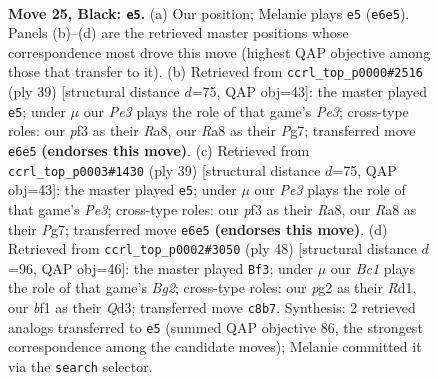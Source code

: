 \documentclass[11pt]{article}
\begin{document}
\clearpage

\begin{figure}[p]\centering
\begin{subfigure}{0.46\textwidth}\centering
\resizebox{\linewidth}{!}{%
\newchessgame
\chessboard[
  setfen={r1b1rk2/3q3p/ppn1pPp1/2p5/P4Q2/2P2P2/6PP/1KN1RBNR b - - 0 25},
  showmover=false,
  pgfstyle=straightmove, color=movearrow, markmove={e6-e5}
]}
\caption{}
\end{subfigure}\hfill
\begin{subfigure}{0.46\textwidth}\centering
\resizebox{\linewidth}{!}{%
\newchessgame
\chessboard[
  setfen={r1br2k1/1p4p1/2nqp2p/p2p4/P7/2P1RN2/1P3PPP/RB1Q2K1 b - - 2 20},
  showmover=false,
  pgfstyle=straightmove, color=movearrow, markmove={e6-e5}
]}
\caption{}
\end{subfigure}
\\[4pt]
\begin{subfigure}{0.46\textwidth}\centering
\resizebox{\linewidth}{!}{%
\newchessgame
\chessboard[
  setfen={r1br2k1/1p4p1/2nqp2p/p2p4/P7/2P1RN2/1P3PPP/RB1Q2K1 b - - 2 20},
  showmover=false,
  pgfstyle=straightmove, color=movearrow, markmove={e6-e5}
]}
\caption{}
\end{subfigure}\hfill
\begin{subfigure}{0.46\textwidth}\centering
\resizebox{\linewidth}{!}{%
\newchessgame
\chessboard[
  setfen={1n2r1k1/4qpp1/2rp4/p6p/Np2PPnP/1P1Q2P1/P5B1/3RR1K1 w - - 2 25},
  showmover=false,
  pgfstyle=straightmove, color=movearrow, markmove={g2-f3}
]}
\caption{}
\end{subfigure}
\caption{\textbf{Move 25, Black: \texttt{e5}.} (a) Our position; Melanie plays \texttt{e5} (\texttt{e6e5}). Panels (b)--(d) are the retrieved master positions whose correspondence most drove this move (highest QAP objective among those that transfer to it). (b) Retrieved from \texttt{ccrl\_top\_p0000\#2516} (ply 39) [structural distance $d$=75, QAP obj=43]: the master played \texttt{e5}; under $\mu$ our \emph{Pe3} plays the role of that game's \emph{Pe3}; cross-type roles: our \emph{p}f3 as their \emph{R}a8, our \emph{R}a8 as their \emph{P}g7; transferred move \texttt{e6e5} \textbf{(endorses this move)}. (c) Retrieved from \texttt{ccrl\_top\_p0003\#1430} (ply 39) [structural distance $d$=75, QAP obj=43]: the master played \texttt{e5}; under $\mu$ our \emph{Pe3} plays the role of that game's \emph{Pe3}; cross-type roles: our \emph{p}f3 as their \emph{R}a8, our \emph{R}a8 as their \emph{P}g7; transferred move \texttt{e6e5} \textbf{(endorses this move)}. (d) Retrieved from \texttt{ccrl\_top\_p0002\#3050} (ply 48) [structural distance $d$=96, QAP obj=46]: the master played \texttt{Bf3}; under $\mu$ our \emph{Bc1} plays the role of that game's \emph{Bg2}; cross-type roles: our \emph{p}g2 as their \emph{R}d1, our \emph{b}f1 as their \emph{Q}d3; transferred move \texttt{c8b7}. Synthesis: 2 retrieved analogs transferred to \texttt{e5} (summed QAP objective 86, the strongest correspondence among the candidate moves); Melanie committed it via the \texttt{search} selector.}
\label{fig:thought-m49}
\end{figure}
\end{document}
